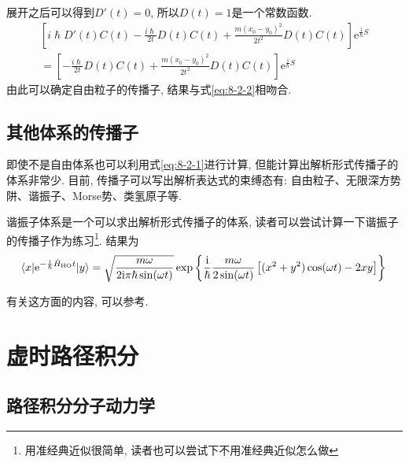         展开之后可以得到\(D'(t) = 0\), 所以\(D(t)=1\)是一个常数函数. 
        \begin{equation}\begin{aligned}
            \left[i\hslash D'(t) C(t) - \frac{i\hslash}{2t} D(t) C(t) + \frac{m(x_0-y_0)^2}{2t^2} D(t) C(t) \right] \mathrm{e}^{\frac {\mathrm{i}}{\hslash} S} \\
            = \left[- \frac{i\hslash}{2t} D(t) C(t) + \frac{m(x_0-y_0)^2}{2t^2} D(t) C(t)\right] \mathrm{e}^{\frac {\mathrm{i}}{\hslash} S}
        \end{aligned}\end{equation}
        由此可以确定自由粒子的传播子, 结果与式\ref{eq:8-2-2}相吻合. 

        \subsection{其他体系的传播子}

        即使不是自由体系也可以利用式\ref{eq:8-2-1}进行计算, 但能计算出解析形式传播子的体系非常少. 
        目前, 传播子可以写出解析表达式的束缚态有: 自由粒子、无限深方势阱、谐振子、Morse势、类氢原子等\cite{Grosche_HFPI}\cite{Kleinnert_PIQMSPP}. 

        谐振子体系是一个可以求出解析形式传播子的体系, 读者可以尝试计算一下谐振子的传播子作为练习\footnote{用准经典近似很简单, 读者也可以尝试下不用准经典近似怎么做}. 结果为
        \begin{equation}
            \langle x | \mathrm{e}^{-\frac {\mathrm{i}}{\hslash}\hat{H}_\mathrm{HO}t} | y \rangle 
            = \sqrt{\frac{m\omega}{2\mathrm{i}\pi\hslash\sin(\omega t)}} \exp\left\{ \frac{\mathrm{i}}{\hslash} \frac{m\omega}{2\sin(\omega t)}\left[ (x^2 + y^2)\cos(\omega t) - 2xy \right] \right\} \\
        \end{equation}

        有关这方面的内容, 可以参考\cite{费曼量子力学与路径积分}\cite{谷村吉隆化学物理入门}.

    \section{虚时路径积分}

        \subsection{路径积分分子动力学}

